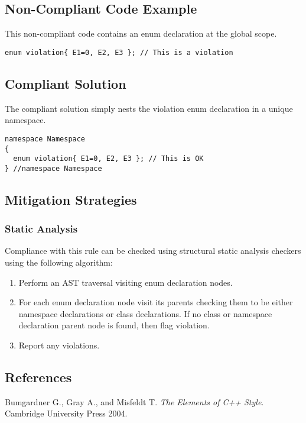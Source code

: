 \subsection{Non-Compliant Code Example}
This non-compliant code contains an enum declaration at the global scope.

\begin{verbatim}
enum violation{ E1=0, E2, E3 }; // This is a violation
\end{verbatim}

\subsection{Compliant Solution}
The compliant solution simply nests the violation enum declaration in a unique namespace.

\begin{verbatim}
namespace Namespace
{
  enum violation{ E1=0, E2, E3 }; // This is OK
} //namespace Namespace
\end{verbatim}

\subsection{Mitigation Strategies}
\subsubsection{Static Analysis} 

Compliance with this rule can be checked using structural static analysis checkers using the following algorithm:

\begin{enumerate}
\item Perform an AST traversal visiting enum declaration nodes.
\item For each enum declaration node visit its parents checking them to be either namespace declarations or class declarations. If no class or namespace declaration parent node is found, then flag violation.
\item Report any violations.
\end{enumerate}

\subsection{References}

Bumgardner G., Gray A., and Misfeldt T. {\it The Elements of C++ Style}. Cambridge University Press 2004.
